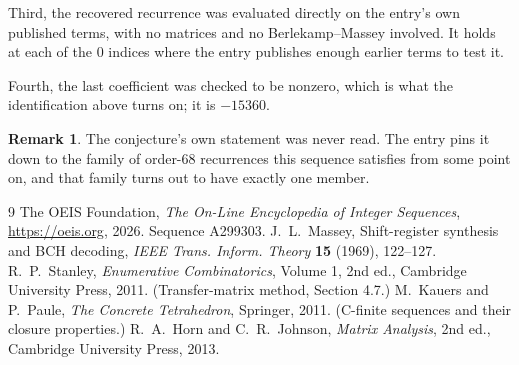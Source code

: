 \documentclass[11pt,a4paper]{article}
\theoremstyle{plain}
\theoremstyle{definition}
\newtheorem{remark}[theorem]{Remark}
\begin{document}
Third, the recovered recurrence was evaluated directly on the entry's own published terms, with
no matrices and no Berlekamp--Massey involved. It holds at each of the $0$ indices where
the entry publishes enough earlier terms to test it.

Fourth, the last coefficient was checked to be nonzero, which is what the identification above
turns on; it is $-15360$.

\begin{remark}
The conjecture's own statement was never read. The entry pins it down to the family of
order-$68$ recurrences this sequence satisfies from some point on, and that family turns
out to have exactly one member.
\end{remark}

\begin{thebibliography}{9}
 The OEIS Foundation, \emph{The On-Line Encyclopedia of Integer
Sequences}, \url{https://oeis.org}, 2026. Sequence A299303.
 J.~L.~Massey, Shift-register synthesis and BCH decoding, \emph{IEEE
Trans. Inform. Theory} \textbf{15} (1969), 122--127.
 R.~P.~Stanley, \emph{Enumerative Combinatorics}, Volume 1, 2nd ed.,
Cambridge University Press, 2011. (Transfer-matrix method, Section 4.7.)
 M.~Kauers and P.~Paule, \emph{The Concrete Tetrahedron}, Springer, 2011.
(C-finite sequences and their closure properties.)
 R.~A.~Horn and C.~R.~Johnson, \emph{Matrix Analysis}, 2nd ed., Cambridge
University Press, 2013.
\end{thebibliography}
\end{document}
